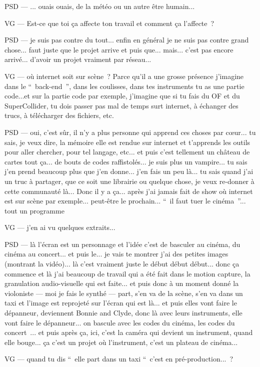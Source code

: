 PSD — ... ouais ouais, de la météo ou un autre être humain...

VG — Est-ce que toi ça affecte ton travail et comment ça l'affecte ?

PSD — je suis pas contre du tout... enfin en général je ne suis pas contre grand chose... faut juste que le projet arrive et puis que... mais... c'est pas encore arrivé... d'avoir un projet vraiment par réseau...

VG — où internet soit sur scène ? Parce qu'il a une grosse présence j'imagine dans le “ back-end ”, dans les coulisses, dans tes instruments tu as une partie code...et sur la partie code par exemple, j'imagine que si tu fais du OF et du SuperCollider, tu dois passer pas mal de temps surt internet, à échanger des trucs, à  télécharger des fichiers, etc.

PSD — oui, c'est sûr, il n'y a plus personne qui apprend ces choses par cœur... tu sais, je veux dire,  la mémoire elle est rendue sur internet et t'apprends les outils pour aller chercher, pour tel langage, etc... et puis c'est tellement un château de cartes tout ça... de bouts de codes raffistolés... je suis plus un vampire... tu sais j'en prend beaucoup plus que j'en donne... j'en fais un peu là... tu sais quand j'ai un truc à partager, que ce soit une librairie ou quelque chose, je veux re-donner à cette communauté là... Donc il y a ça... après j'ai jamais fait de show où internet est sur scène par exemple... peut-être le prochain... “ il faut tuer le cinéma ”... tout un programme 

VG — j'en ai vu quelques extraits...

PSD — là l'écran est un personnage et l'idée c'est de basculer au cinéma, du cinéma au concert... et puis le... je vais te montrer j'ai des petites images (montrant la vidéo)... là c'est vraiment juste le début début début... donc ça commence et là j'ai beaucoup de travail qui a été fait dans le motion capture, la granulation audio-visuelle qui est faite... et puis donc à un moment donné la violoniste — moi je fais le synthé — part, s'en va de la scène, s'en va dans un taxi et l'image est reprojeté sur l'écran qui est là... et puis elles vont faire le dépanneur, deviennent Bonnie and Clyde, donc là avec leurs instruments, elle vont faire le dépanneur... on bascule avec les codes du cinéma, les codes du concert ... et puis après ça, ici, c'est la caméra qui devient un instrument, quand elle bouge... ça c'est un projet où l'instrument, c'est un plateau de cinéma...

VG — quand tu dis “ elle part dans un taxi “ c'est en pré-production... ?

